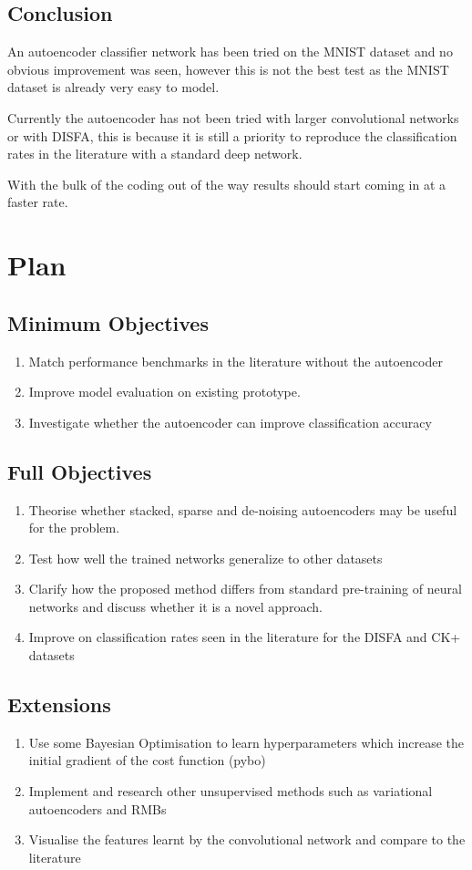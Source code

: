 \documentclass[9pt]{article} \usepackage{amsmath, amsthm, amssymb}
\begin{document}
\subsection{Conclusion}

An autoencoder classifier  network has been tried on the MNIST dataset and no obvious improvement
was seen, however this is not the best test as the MNIST dataset is already very easy to model.

Currently the autoencoder has not been tried with larger convolutional networks or with DISFA,
this is because it is still a priority to reproduce the classification rates in the literature
with a standard deep network.

With the bulk of the coding out of the way results should start coming in at a faster rate.

%
%
%
\section{Plan}
\subsection{Minimum Objectives}
\begin{enumerate}
  \item Match performance benchmarks in the literature without the autoencoder
  \item Improve model evaluation on existing prototype.
  \item Investigate whether the autoencoder can improve classification accuracy
\end{enumerate}
\subsection{Full Objectives}
\begin{enumerate}
  \item Theorise whether stacked, sparse and de-noising autoencoders may
        be useful for the problem.
  \item Test how well the trained networks generalize to other datasets
  \item Clarify how the proposed method differs from standard pre-training of
        neural networks and discuss whether it is a novel approach.
  \item Improve on classification rates seen in the literature for the DISFA and CK+ datasets
\end{enumerate}
\subsection{Extensions}
\begin{enumerate}
  \item Use some Bayesian Optimisation to learn hyperparameters which increase
        the initial gradient of the cost function (pybo)
  \item Implement and research other unsupervised methods such as variational
        autoencoders and RMBs
  \item Visualise the features learnt by the convolutional network and compare
        to the literature
\end{enumerate}




\end{document}
